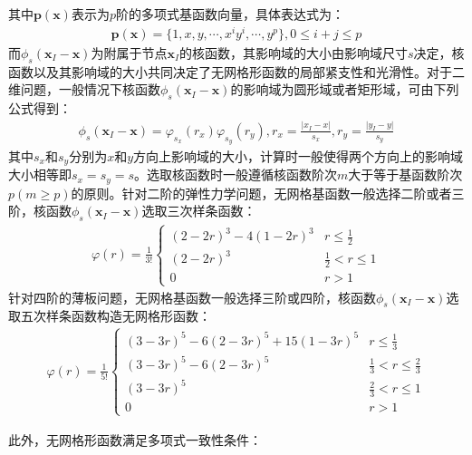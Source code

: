 其中$\pmb{p}(\pmb{x})$表示为$p$阶的多项式基函数向量，具体表达式为：
\begin{equation}
\begin{split}
    \pmb{p}(\pmb{x})=\{1,x,y,\dotsb,x^iy^i,\dotsb,y^p\},0\le i+j \le p
\end{split}
\end{equation}
而$\phi_s(\pmb{x}_I-\pmb{x})$为附属于节点$\pmb{x}_I$的核函数，其影响域的大小由影响域尺寸$s$决定，核函数以及其影响域的大小共同决定了无网格形函数的局部紧支性和光滑性。对于二维问题，一般情况下核函数$\phi_s(\pmb{x}_I-\pmb{x})$的影响域为圆形域或者矩形域，可由下列公式得到：
\begin{equation}
\begin{split}
    \phi_s(\pmb{x}_I-\pmb{x})=\varphi_{s_x}(r_x)\varphi_{s_y}(r_y),r_x=\frac{\lvert x_I-x\rvert}{s_x},r_y=\frac{\lvert y_I-y \rvert}{s_y}
\end{split}
\end{equation}
其中$s_x$和$s_y$分别为$x$和$y$方向上影响域的大小，计算时一般使得两个方向上的影响域大小相等即$s_x=s_y=s$。选取核函数时一般遵循核函数阶次$m$大于等于基函数阶次$p(m\ge p)$的原则。针对二阶的弹性力学问题，无网格基函数一般选择二阶或者三阶，核函数$\phi_s(\pmb{x}_I-\pmb{x})$选取三次样条函数：
\begin{equation}
\begin{split}
    \varphi(r)=\frac{1}{3!}
\begin{cases}
    (2-2r)^3-4(1-2r)^3 &r\le \frac{1}{2}\\
    (2-2r)^3&\frac{1}{2}<r\le 1\\
    0&r>1
\end{cases}
\end{split}
\end{equation}
针对四阶的薄板问题，无网格基函数一般选择三阶或四阶，核函数$\phi_s(\pmb{x}_I-\pmb{x})$选取五次样条函数构造无网格形函数：
\begin{equation}
\begin{split}
        \varphi(r)=\frac{1}{5!}
\begin{cases}
        (3-3r)^5-6(2-3r)^5+15(1-3r)^5&r\le\frac{1}{3}\\
        (3-3r)^5-6(2-3r)^5&\frac{1}{3}<r\le\frac{2}{3}\\
        (3-3r)^5&\frac{2}{3}<r\le1\\
        0&r>1
\end{cases}
\end{split}
\end{equation}\par
此外，无网格形函数满足多项式一致性条件：

